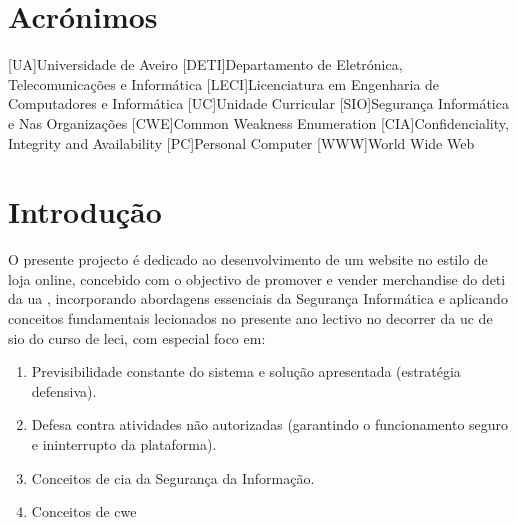 
	
	
	
	
	
	

\renewcommand{\contentsname}{Índice}
\tableofcontents
\listoffigures
{}


\chapter*{Acrónimos}
\begin{acronym}

[UA]{Universidade de Aveiro}
[DETI]{Departamento de Eletrónica, Telecomunicações e Informática}
[LECI]{Licenciatura em Engenharia de Computadores e Informática}
[UC]{Unidade Curricular}
[SIO]{Segurança Informática e Nas Organizações} 
[CWE]{Common Weakness Enumeration}
[CIA]{Confidenciality, Integrity and Availability}
[PC]{Personal Computer}
[WWW]{World Wide Web}
\end{acronym}


\pagestyle{fancy}
\fancyhf{}
\chead{\titulo}
\cfoot{\thepage}
%
\chapter{Introdução}
\label{chap.Intro}

O presente projecto é dedicado ao desenvolvimento de um website no estilo de loja online, concebido com o objectivo de promover e vender merchandise do \acf{deti} da \acf{ua} , incorporando abordagens essenciais da Segurança Informática e aplicando conceitos fundamentais lecionados no presente ano lectivo no decorrer da \acf{uc} de \acf{sio} do curso de \acf{leci}, com especial foco em: 

\begin{enumerate}
	\item Previsibilidade constante do sistema e solução apresentada (estratégia defensiva).
	\item Defesa contra atividades não autorizadas (garantindo o funcionamento seguro e ininterrupto da plataforma).
	\item Conceitos de \acf{cia} da Segurança da Informação.
	\item Conceitos de \acf{cwe}
\end{enumerate}


